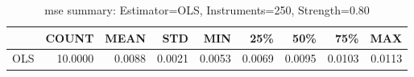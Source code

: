 \begin{table}[ht]
\centering
\caption{mse summary: Estimator=OLS, Instruments=250, Strength=0.80}
\begin{tabular}{lrrrrrrrr}
\toprule
 & COUNT & MEAN & STD & MIN & 25\% & 50\% & 75\% & MAX \\
\midrule
OLS & 10.0000 & 0.0088 & 0.0021 & 0.0053 & 0.0069 & 0.0095 & 0.0103 & 0.0113 \\
\bottomrule
\end{tabular}
\end{table}
